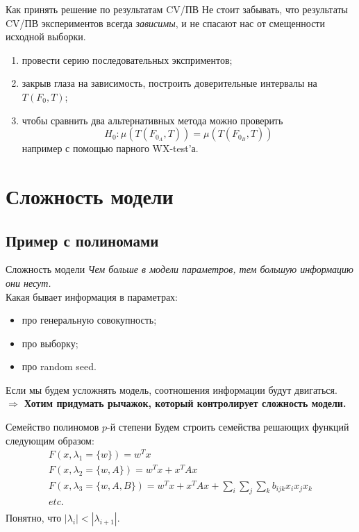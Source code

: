\documentclass[14pt, fleqn, xcolor={dvipsnames, table}]{beamer}
\begin{document}
\begin{frame}{Как принять решение по результатам CV/ПВ}
Не стоит забывать, что результаты CV/ПВ экспериментов всегда {\color{red} \em зависимы}, и не спасают нас от смещенности исходной выборки.
\begin{enumerate}
  \item провести серию последовательных эксприментов;
  \item закрыв глаза на зависимость, построить доверительные интервалы на $T(F_0, T)$;
  \item чтобы сравнить два альтернативных метода можно проверить
  $$H_0: \mu\left(T(F_{0_A}, T)\right) = \mu\left(T(F_{0_B}, T)\right)$$
  например с помощью парного WX-test'а.
\end{enumerate}

\end{frame}

\section{Сложность модели}
\subsection{Пример с полиномами}

\begin{frame}{Сложность модели}{}
{\em Чем больше в модели параметров, тем большую информацию они несут.}\\
\flushleft
Какая бывает информация в параметрах:
\begin{itemize}
  \item про генеральную совокупность;
  \item про выборку;
  \item про random seed.
\end{itemize}
Если мы будем усложнять модель, соотношения информации будут двигаться.\\

\textbf{$\Rightarrow$ Хотим придумать рычажок, который контролирует сложность модели.}
\end{frame}

\begin{frame}{Семейство полиномов $p$-й степени}
Будем строить семейства решающих функций следующим образом:
\small
$$\begin{array}{l}
F(x, \lambda_1=\{w\}) = w^Tx \\
F(x, \lambda_2=\{w,A\}) = w^Tx + x^TAx\\
F(x, \lambda_3=\{w,A,B\}) = w^Tx + x^TAx + \sum_i\sum_j\sum_k b_{ijk} x_i x_j x_k\\
etc.\\
\end{array}$$
Понятно, что $|\lambda_i| < |\lambda_{i+1}|$.
\end{frame}
\end{document}
